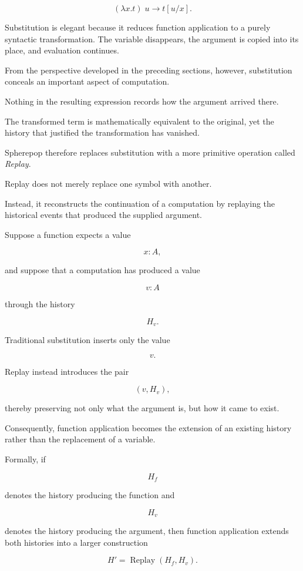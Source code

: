 \documentclass[12pt,oneside]{article}
\theoremstyle{definition}
\theoremstyle{remark}
\begin{document}
\[
(\lambda x.t)\;u
\longrightarrow
t[u/x].
\]

Substitution is elegant because it reduces function application to a purely
syntactic transformation. The variable disappears, the argument is copied into
its place, and evaluation continues.

From the perspective developed in the preceding sections, however,
substitution conceals an important aspect of computation.

Nothing in the resulting expression records how the argument arrived there.

The transformed term is mathematically equivalent to the original, yet the
history that justified the transformation has vanished.

Spherepop therefore replaces substitution with a more primitive operation
called \emph{Replay}.

Replay does not merely replace one symbol with another.

Instead, it reconstructs the continuation of a computation by replaying the
historical events that produced the supplied argument.

Suppose a function expects a value

\[
x:A,
\]

and suppose that a computation has produced a value

\[
v:A
\]

through the history

\[
H_v.
\]

Traditional substitution inserts only the value

\[
v.
\]

Replay instead introduces the pair

\[
(v,H_v),
\]

thereby preserving not only what the argument is, but how it came to exist.

Consequently, function application becomes the extension of an existing
history rather than the replacement of a variable.

Formally, if

\[
H_f
\]

denotes the history producing the function and

\[
H_v
\]

denotes the history producing the argument, then function application extends
both histories into a larger construction

\[
H'
=
\operatorname{Replay}(H_f,H_v).
\]
\end{document}
